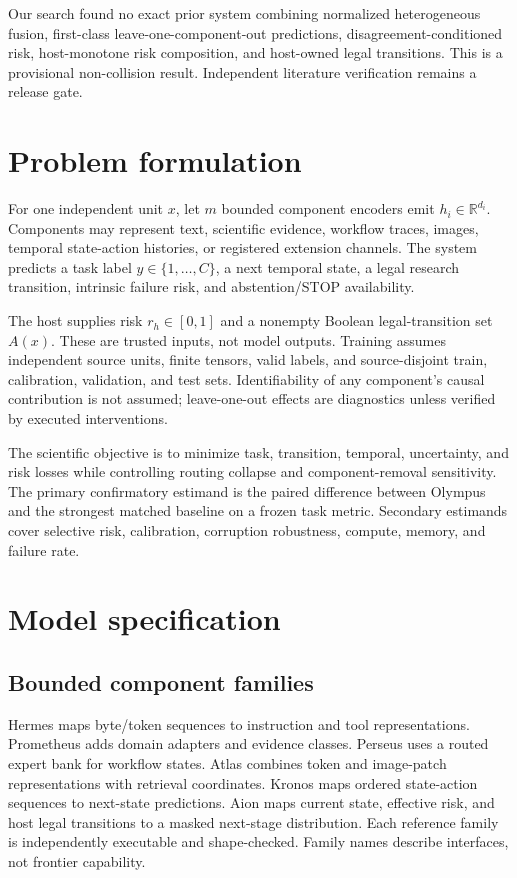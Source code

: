 \documentclass[10pt]{article}
\newcommand{\RR}{\mathbb{R}}
\begin{document}
Our search found no exact prior system combining normalized heterogeneous fusion,
first-class leave-one-component-out predictions, disagreement-conditioned risk,
host-monotone risk composition, and host-owned legal transitions. This is a provisional
non-collision result. Independent literature verification remains a release gate.

\section{Problem formulation}
For one independent unit $x$, let $m$ bounded component encoders emit
$h_i\in\RR^{d_i}$. Components may represent text, scientific evidence, workflow traces,
images, temporal state-action histories, or registered extension channels. The system
predicts a task label $y\in\{1,\ldots,C\}$, a next temporal state, a legal research
transition, intrinsic failure risk, and abstention/STOP availability.

The host supplies risk $r_h\in[0,1]$ and a nonempty Boolean legal-transition set $A(x)$.
These are trusted inputs, not model outputs. Training assumes independent source units,
finite tensors, valid labels, and source-disjoint train, calibration, validation, and test
sets. Identifiability of any component's causal contribution is not assumed; leave-one-out
effects are diagnostics unless verified by executed interventions.

The scientific objective is to minimize task, transition, temporal, uncertainty, and
risk losses while controlling routing collapse and component-removal sensitivity. The
primary confirmatory estimand is the paired difference between Olympus and the strongest
matched baseline on a frozen task metric. Secondary estimands cover selective risk,
calibration, corruption robustness, compute, memory, and failure rate.

\section{Model specification}
\subsection{Bounded component families}
Hermes maps byte/token sequences to instruction and tool representations. Prometheus adds
domain adapters and evidence classes. Perseus uses a routed expert bank for workflow
states. Atlas combines token and image-patch representations with retrieval coordinates.
Kronos maps ordered state-action sequences to next-state predictions. Aion maps current
state, effective risk, and host legal transitions to a masked next-stage distribution.
Each reference family is independently executable and shape-checked. Family names describe
interfaces, not frontier capability.
\end{document}
